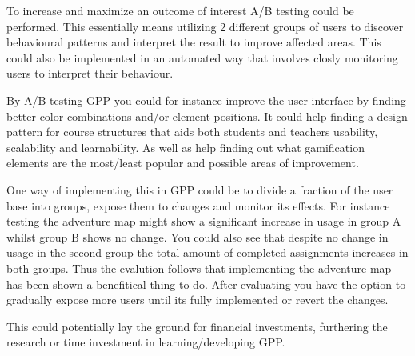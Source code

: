 To increase and maximize an outcome of interest A/B testing could be performed.
This essentially means utilizing 2 different groups of users to discover behavioural patterns and
interpret the result to improve affected areas.
This could also be implemented in an automated way that involves closly monitoring users to interpret their behaviour.

By A/B testing GPP you could for instance improve the user interface by finding better color
combinations and/or element positions. It could help finding a design pattern for course structures that aids both students and
teachers usability, scalability and learnability. As well as help finding out what gamification elements are the most/least
popular and possible areas of improvement.

One way of implementing this in GPP could be to divide a fraction of the user base into groups, expose them to changes and monitor its effects.
For instance testing the adventure map might show a significant increase in usage in group A whilst group B shows no change.
You could also see that despite no change in usage in the second group the total amount of completed assignments increases in both groups.
Thus the evalution follows that implementing the adventure map has been shown a benefitical thing to do.
After evaluating you have the option to gradually expose more users until its fully implemented or revert the changes.

This could potentially lay the ground for financial investments, furthering the research or time investment in
learning/developing GPP.
